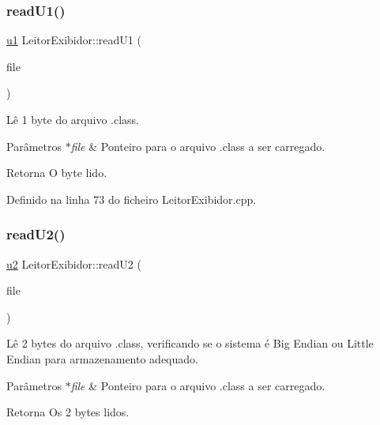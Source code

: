 \subsubsection{\texorpdfstring{read\+U1()}{readU1()}}
{\footnotesize\ttfamily \hyperlink{BasicTypes_8h_ad9f4cdb6757615aae2fad89dab3c5470}{u1} Leitor\+Exibidor\+::read\+U1 (\begin{DoxyParamCaption}\item[{F\+I\+LE $\ast$}]{file }\end{DoxyParamCaption})\hspace{0.3cm}{\ttfamily [private]}}

Lê 1 byte do arquivo .class. 
\begin{DoxyParams}{Parâmetros}
{\em $\ast$file} & Ponteiro para o arquivo .class a ser carregado. \\
\hline
\end{DoxyParams}
\begin{DoxyReturn}{Retorna}
O byte lido. 
\end{DoxyReturn}


Definido na linha 73 do ficheiro Leitor\+Exibidor.\+cpp.

\mbox{\label{classLeitorExibidor_aa801d28856915543cfd59fb787e59626}} 
\subsubsection{\texorpdfstring{read\+U2()}{readU2()}}
{\footnotesize\ttfamily \hyperlink{BasicTypes_8h_a732cde1300aafb73b0ea6c2558a7a54f}{u2} Leitor\+Exibidor\+::read\+U2 (\begin{DoxyParamCaption}\item[{F\+I\+LE $\ast$}]{file }\end{DoxyParamCaption})\hspace{0.3cm}{\ttfamily [private]}}

Lê 2 bytes do arquivo .class, verificando se o sistema é Big Endian ou Little Endian para armazenamento adequado. 
\begin{DoxyParams}{Parâmetros}
{\em $\ast$file} & Ponteiro para o arquivo .class a ser carregado. \\
\hline
\end{DoxyParams}
\begin{DoxyReturn}{Retorna}
Os 2 bytes lidos. 
\end{DoxyReturn}


